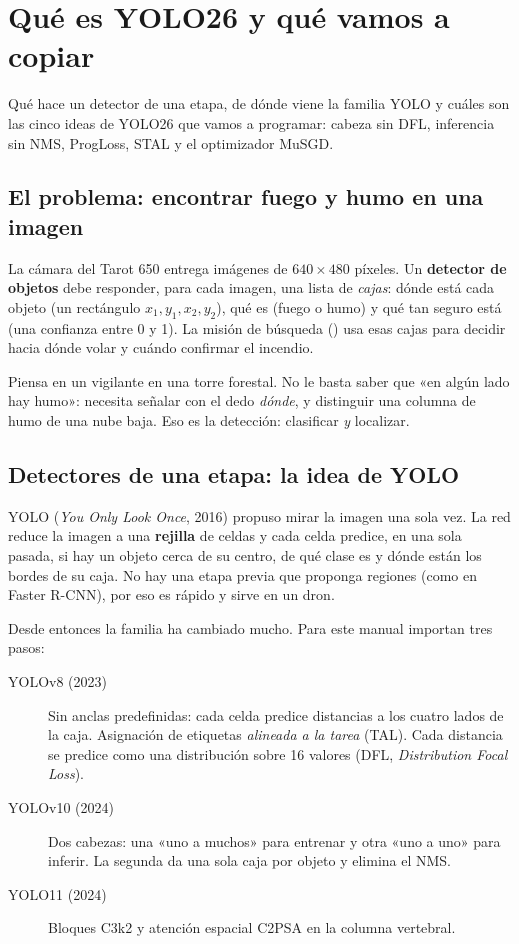 \chapter{Qué es YOLO26 y qué vamos a copiar}
\label{cap:yolo26}

\begin{enpocas}
Qué hace un detector de una etapa, de dónde viene la familia YOLO y cuáles son
las cinco ideas de YOLO26 que vamos a programar: cabeza sin DFL, inferencia
sin NMS, ProgLoss, STAL y el optimizador MuSGD.
\end{enpocas}

\section{El problema: encontrar fuego y humo en una imagen}

La cámara del Tarot 650 entrega imágenes de $640\times480$ píxeles. Un
\textbf{detector de objetos} debe responder, para cada imagen, una lista de
\emph{cajas}: dónde está cada objeto (un rectángulo $x_1,y_1,x_2,y_2$), qué
es (fuego o humo) y qué tan seguro está (una confianza entre 0 y 1). La
misión de búsqueda () usa esas cajas para decidir hacia
dónde volar y cuándo confirmar el incendio.

\begin{ejemplo}
Piensa en un vigilante en una torre forestal. No le basta saber que «en algún
lado hay humo»: necesita señalar con el dedo \emph{dónde}, y distinguir una
columna de humo de una nube baja. Eso es la detección: clasificar \emph{y}
localizar.
\end{ejemplo}

\section{Detectores de una etapa: la idea de YOLO}

YOLO (\emph{You Only Look Once}, 2016) propuso mirar la imagen una sola vez.
La red reduce la imagen a una \textbf{rejilla} de celdas y cada celda predice,
en una sola pasada, si hay un objeto cerca de su centro, de qué clase es y
dónde están los bordes de su caja. No hay una etapa previa que proponga
regiones (como en Faster R-CNN), por eso es rápido y sirve en un dron.

Desde entonces la familia ha cambiado mucho. Para este manual importan tres pasos:
\begin{description}
  \item[YOLOv8 (2023)] Sin anclas predefinidas: cada celda predice distancias a los
        cuatro lados de la caja. Asignación de etiquetas \emph{alineada a la tarea}
        (TAL). Cada distancia se predice como una distribución sobre 16 valores
        (DFL, \emph{Distribution Focal Loss}).
  \item[YOLOv10 (2024)] Dos cabezas: una «uno a muchos» para entrenar y otra
        «uno a uno» para inferir. La segunda da una sola caja por objeto y
        elimina el NMS.
  \item[YOLO11 (2024)] Bloques C3k2 y atención espacial C2PSA en la columna vertebral.
\end{description}

